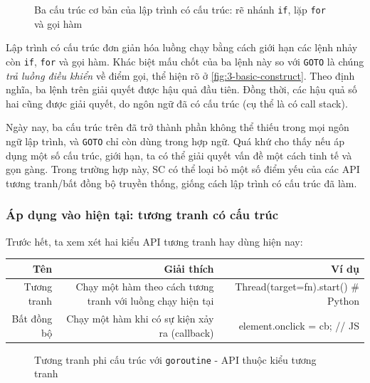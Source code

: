 \documentclass[../../thesis]{subfiles}
\begin{document}
\begin{figure}
    \centering
    \vspace*{-6mm}
    
    \vspace*{-10mm}
    \caption{Ba cấu trúc cơ bản của lập trình có cấu trúc: rẽ nhánh \texttt{if},
        lặp \texttt{for} và gọi hàm}
    \label{fig:3-basic-construct}
\end{figure}

Lập trình có cấu trúc đơn giản hóa luồng chạy bằng cách giới hạn các lệnh nhảy
còn \texttt{if}, \texttt{for} và gọi hàm. Khác biệt mấu chốt của ba lệnh này so
với \texttt{GOTO} là chúng \emph{trả luồng điều khiển} về điểm gọi, thể hiện rõ
ở \autoref{fig:3-basic-construct}. Theo định nghĩa, ba lệnh trên giải quyết được
hậu quả đầu tiên. Đồng thời, các hậu quả số hai cũng được giải quyết, do ngôn
ngữ đã có cấu trúc (cụ thể là có call stack).

Ngày nay, ba cấu trúc trên đã trở thành phần không thể thiếu trong mọi ngôn ngữ
lập trình, và \texttt{GOTO} chỉ còn dùng trong hợp ngữ. Quá khứ cho thấy nếu áp
dụng một số cấu trúc, giới hạn, ta có thể giải quyết vấn đề một cách tinh tế và
gọn gàng. Trong trường hợp này, SC có thể loại bỏ một số điểm yếu của các API
tương tranh/bất đồng bộ truyền thống, giống cách lập trình có cấu trúc đã làm.

\subsubsection{Áp dụng vào hiện tại: tương tranh có cấu trúc}

Trước hết, ta xem xét hai kiểu API tương tranh hay dùng hiện nay:

\begin{table}[H]
    \begin{tabular}{r r r}
        \toprule
        Tên         & Giải thích                                                 & Ví dụ \\
        \midrule
        Tương tranh & Chạy một hàm theo cách tương tranh với luồng chạy hiện tại & Thread(target=fn).start() \# Python \\
        Bất đồng bộ & Chạy một hàm khi có sự kiện xảy ra (callback)              & element.onclick = cb; // JS \\
        \bottomrule
    \end{tabular}
\end{table}

\begin{figure}
    \centering
    \vspace*{-6mm}
    
    \vspace*{-10mm}
    \caption{Tương tranh phi cấu trúc với \texttt{goroutine} - API thuộc kiểu
    tương tranh}
    \label{fig:goroutine}
\end{figure}
\end{document}
